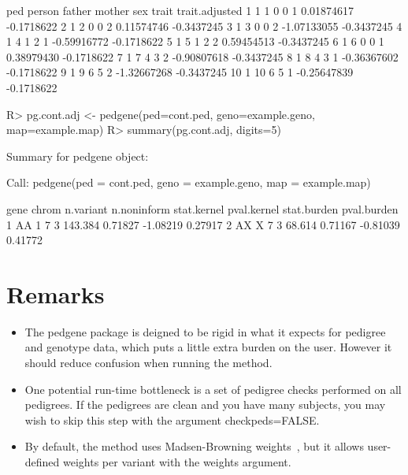 \documentclass[letterpaper]{article}
\begin{document}
\begin{Schunk}
\begin{Soutput}
   ped person father mother sex       trait trait.adjusted
1    1      1      0      0   1  0.01874617     -0.1718622
2    1      2      0      0   2  0.11574746     -0.3437245
3    1      3      0      0   2 -1.07133055     -0.3437245
4    1      4      1      2   1 -0.59916772     -0.1718622
5    1      5      1      2   2  0.59454513     -0.3437245
6    1      6      0      0   1  0.38979430     -0.1718622
7    1      7      4      3   2 -0.90807618     -0.3437245
8    1      8      4      3   1 -0.36367602     -0.1718622
9    1      9      6      5   2 -1.32667268     -0.3437245
10   1     10      6      5   1 -0.25647839     -0.1718622
\end{Soutput}
\begin{Sinput}
R> pg.cont.adj <- pedgene(ped=cont.ped, geno=example.geno, map=example.map)
R> summary(pg.cont.adj, digits=5)
\end{Sinput}
\begin{Soutput}
Summary for pedgene object: 

Call:
pedgene(ped = cont.ped, geno = example.geno, map = example.map)


  gene chrom n.variant n.noninform stat.kernel pval.kernel stat.burden pval.burden
1   AA     1         7           3     143.384     0.71827    -1.08219     0.27917
2   AX     X         7           3      68.614     0.71167    -0.81039     0.41772
\end{Soutput}
\end{Schunk}

\section{Remarks}

\begin{itemize}
\item The pedgene package is deigned to be rigid in what it expects for pedigree 
    and genotype data, which puts a little extra burden on the user.  However it 
    should reduce confusion when running the method.  
\item One potential run-time bottleneck is a set of pedigree checks performed on all pedigrees.
    If the pedigrees are clean and you have many subjects, you may wish to skip this step with 
    the argument checkpeds=FALSE. 
\item By default, the method uses Madsen-Browning weights~\cite{Madsen}, but it allows user-defined weights 
    per variant with the weights argument.
\end{itemize}
\end{document}
